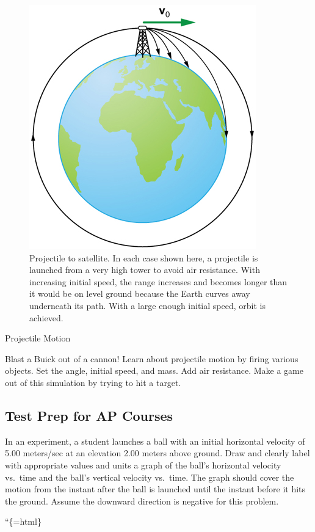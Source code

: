 \documentclass[
]{book}
\newenvironment{ap-test-prep}{}{}
\newenvironment{note}{}{}
\begin{document}
\begin{figure}
\hypertarget{import-auto-id1645881}{%
\centering
\includegraphics{images/Figure_03_04_06a.jpg}
\caption{Projectile to satellite. In each case shown here, a projectile is
launched from a very high tower to avoid air resistance. With increasing
initial speed, the range increases and becomes longer than it would be
on level ground because the Earth curves away underneath its path. With
a large enough initial speed, orbit is
achieved.}\label{import-auto-id1645881}
}
\end{figure}

\hypertarget{eip-89}{}
\begin{note}

Projectile Motion

Blast a Buick out of a cannon! Learn about projectile motion by firing
various objects. Set the angle, initial speed, and mass. Add air
resistance. Make a game out of this simulation by trying to hit a
target.

\hypertarget{fs-id1167061400916}{}

\end{note}

\hypertarget{fs-id1619869}{}
\begin{ap-test-prep}

\hypertarget{test-prep-for-ap-courses-8}{%
\subsection{Test Prep for AP Courses}\label{test-prep-for-ap-courses-8}}

\hypertarget{fs-id1316152}{}
\leavevmode\hypertarget{fs-id1749813}{}%
In an experiment, a student launches a ball with an initial horizontal
velocity of 5.00 meters/sec at an elevation 2.00 meters above ground.
Draw and clearly label with appropriate values and units a graph of the
ball's horizontal velocity vs.~time and the ball's vertical velocity
vs.~time. The graph should cover the motion from the instant after the
ball is launched until the instant before it hits the ground. Assume the
downward direction is negative for this problem.

``\{=html\}

\end{ap-test-prep}
\end{document}
